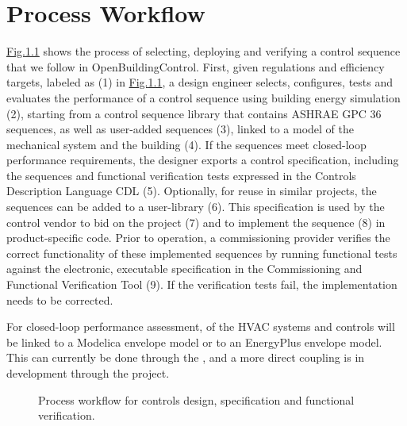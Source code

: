 \documentclass[letterpaper,10pt, openany,english]{sphinxmanual}
\let\sphinxpxdimen\pdfpxdimen\else\newdimen\sphinxpxdimen
\begin{document}
\chapter{Process Workflow}
\label{\detokenize{process:process-workflow}}\label{\detokenize{process:sec-process}}\label{\detokenize{process::doc}}
\hyperref[\detokenize{process:fig-process}]{Fig.\@ \ref{\detokenize{process:fig-process}}} shows the process of selecting, deploying and verifying a control sequence
that we follow in OpenBuildingControl.
First, given regulations and efficiency targets, labeled as (1) in \hyperref[\detokenize{process:fig-process}]{Fig.\@ \ref{\detokenize{process:fig-process}}},
a design engineer selects, configures, tests and evaluates the performance of a control sequence
using building energy simulation (2),
starting from a control sequence library that contains ASHRAE GPC 36 sequences,
as well as user-added sequences (3),
linked to a model of the mechanical system and the building (4).
If the sequences meet closed-loop performance requirements,
the designer exports a control specification,
including the sequences and functional verification tests expressed in
the Controls Description Language CDL (5).
Optionally, for reuse in similar projects,
the sequences can be added to a user-library (6).
This specification is used by the control vendor to bid on the project (7)
and to implement the sequence (8) in product-specific code.
Prior to operation, a commissioning provider verifies
the correct functionality of these implemented sequences
by running functional tests against the electronic, executable specification
in the Commissioning and Functional Verification Tool (9).
If the verification tests fail, the implementation needs to be corrected.

For closed-loop performance assessment,
of the HVAC systems and controls will be linked to
a Modelica envelope model or to
an EnergyPlus envelope model. This can currently be done through the
,
and a more direct coupling is in development through the
 project.

\begin{figure}[htbp]
\centering
\capstart

\noindent\sphinxincludegraphics[width=800\sphinxpxdimen]{{ControlsDesignVerficationFlow}.pdf}
\caption{Process workflow for controls design, specification and
functional verification.}\label{\detokenize{process:id1}}\label{\detokenize{process:fig-process}}\end{figure}
\end{document}
